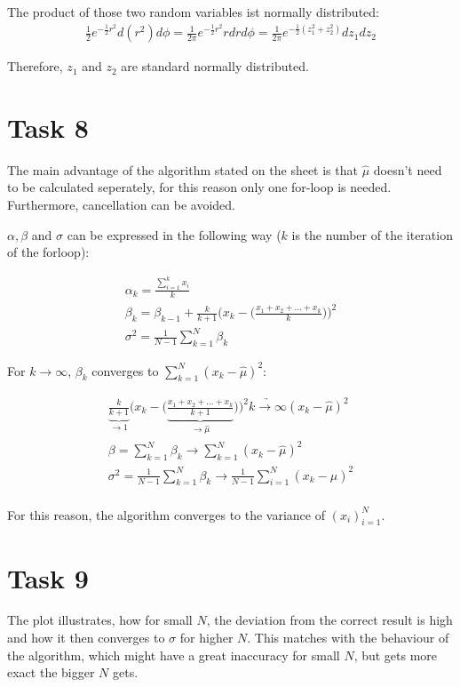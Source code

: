 \documentclass[10pt,a4paper]{article}
\begin{document}
The product of those two random variables ist normally distributed:
\begin{align*}
\frac{1}{2}e^{-\frac{1}{2}r^2}d(r^2)d\phi = \frac{1}{2\pi}e^{-\frac{1}{2}r^2}rdrd\phi = \frac{1}{2\pi}e^{-\frac{1}{2}(z_1^2+z_2^2)}dz_1dz_2
\end{align*} 

Therefore, $z_1$ and $z_2$ are standard normally distributed.

\section*{Task 8}

The main advantage of the algorithm stated on the sheet is that $\hat{\mu}$ doesn't need to be calculated seperately, for this reason only one for-loop is needed. Furthermore, cancellation can be avoided.

$\alpha, \beta$ and $\sigma$ can be expressed in the following way ($k$ is the number of the iteration of the forloop):

\begin{gather*}
\alpha_k = \frac{\sum_{i=1}^k x_i}{k} \\
\beta_k = \beta_{k-1}+\frac{k}{k+1}\bigg(x_k-\bigg(\frac{x_1+x_2+...+x_{k}}{k}\bigg)\bigg)^2 \\
\sigma^2 = \frac{1}{N-1}\sum_{k=1}^N\beta_k
\end{gather*}

For $k \to \infty$, $\beta_k$ converges to $\sum_{k=1}^N (x_k-\hat{\mu})^2$:

\begin{gather*}
\underbrace{\frac{k}{k+1}}_{\to 1}\bigg(x_k-\bigg(\underbrace{\frac{x_1+x_2+...+x_{k}}{k+1}}_{\to \hat{\mu}}\bigg)\bigg)^2 \underrightarrow{k\to\infty} (x_k-\hat{\mu})^2 \\
\beta = \sum_{k=1}^N \beta_k \to \sum_{k=1}^N (x_k-\hat{\mu})^2 \\
\sigma^2 = \frac{1}{N-1}\sum_{k=1}^N\beta_k \to \frac{1}{N-1} \sum_{i=1}^N (x_k-\hat{\mu})^2 \\
\end{gather*}

For this reason, the algorithm converges to the variance of $(x_i)_{i=1}^N$.

\section*{Task 9}

The plot illustrates, how for small $N$, the deviation from the correct result is high and how it then converges to $\sigma$ for higher $N$. This matches with the behaviour of the algorithm, which might have a great inaccuracy for small $N$, but gets more exact the bigger $N$ gets.
\end{document}
